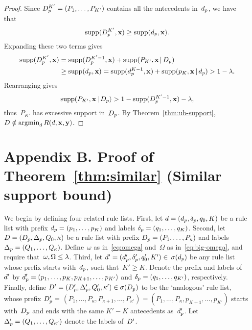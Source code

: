 \begin{proof}
Since ${D_p^{K'} = (P_1, \dots, P_{K'})}$
contains all the antecedents in~$d_p$, we have that
\begin{align}
\textnormal{supp}(D_p^{K'}, \mathbf{x}) \ge \textnormal{supp}(d_p, \mathbf{x}).
\end{align}
Expanding these two terms gives
\begin{align}
\textnormal{supp}(D_p^{K'}, \mathbf{x})
&= \textnormal{supp}(D_p^{K'-1}, \mathbf{x}) + \textnormal{supp}(P_{K'}, \mathbf{x} \,|\, D_p) \nonumber \\
&\ge \textnormal{supp}(d_p, \mathbf{x})
= \textnormal{supp}(d_p^{K-1}, \mathbf{x}) + \textnormal{supp}(p_K, \mathbf{x} \,|\, d_p)
> 1 - {\lambda}.
\end{align}
Rearranging gives
\begin{align}
\textnormal{supp}(P_{K'}, \mathbf{x} \,|\, D_p)
> 1 - \textnormal{supp}(D_p^{K'-1}, \mathbf{x}) - {\lambda},
\end{align}
thus~$P_{K'}$ has excessive support in~$D_p$.
%
By Theorem~\ref{thm:ub-support},
${{D} \notin \operatorname*{argmin}_{{d}} R({d}, \mathbf{x}, \mathbf{y})}$.
\end{proof}

\section*{Appendix B. Proof of Theorem~\ref{thm:similar} (Similar support bound)}

We begin by defining four related rule lists.
%
First, let ${{d} = (d_p, \delta_p, q_0, K)}$
be a rule list with prefix ${d_p = (p_1, \dots, p_K)}$
and labels ${\delta_p = (q_1, \dots, q_K)}$.
%
Second, let ${{D} = (D_p, \Delta_p, Q_0, \kappa)}$
be a rule list with prefix ${D_p = (P_1, \dots, P_\kappa)}$
and labels ${\Delta_p = (Q_1, \dots, Q_\kappa)}$.
%
Define~$\omega$ as in~\eqref{eq:omega}
and~$\Omega$ as in~\eqref{eq:big-omega},
and require that~${\omega, \Omega \le {\lambda}}$.
%
Third, let ${{d}' = (d_p', \delta_p', q_0', K') \in}$
${\sigma(d_p)}$ be any rule list
whose prefix starts with~$d_p$, such that~${K' \ge K}$.
%
Denote the prefix and labels of~${d}'$ by
${d_p' = (p_1, \dots, p_K, p_{K+1}, \dots, p_{K'})}$
and ${\delta_p = (q_1, \dots, q_{K'})}$,
respectively.
%
Finally, define
${{D}' = (D_p', \Delta_p', Q_0', \kappa') \in \sigma(D_p)}$
to be the `analogous' rule list, \ie whose prefix
${D_p' =}$ ${(P_1, \dots, P_\kappa, P_{\kappa+1}, \dots, P_{\kappa'})
= (P_1, \dots, P_\kappa, p_{K+1}, \dots, p_{K'})}$
starts with~$D_p$ and ends with the same ${K'-K}$
antecedents as~$d_p'$.
%
Let ${\Delta_p' = (Q_1, \dots, Q_{\kappa'})}$
denote the labels of~${D}'$.

